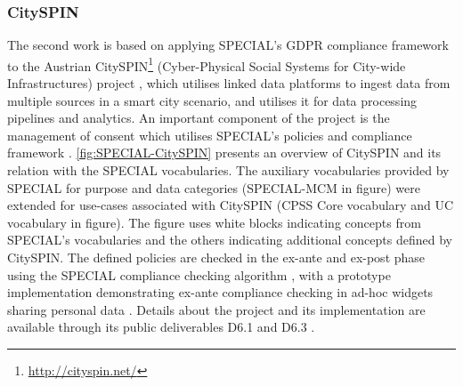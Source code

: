 

\subsubsection{CitySPIN}
The second work is based on applying SPECIAL's GDPR compliance framework to the Austrian CitySPIN\footnote{\url{http://cityspin.net/}} (Cyber-Physical Social Systems for City-wide Infrastructures) project \cite{fernandez_user_2019}, which utilises linked data platforms to ingest data from multiple sources in a smart city scenario, and utilises it for data processing pipelines and analytics. An important component of the project is the management of consent which utilises SPECIAL's policies \cite{bonatti_special_2018-1,bonatti_special_2018-2} and compliance framework \cite{kirrane_scalable_2018}.
\autoref{fig:SPECIAL-CitySPIN} presents an overview of CitySPIN and its relation with the SPECIAL vocabularies. The auxiliary vocabularies provided by SPECIAL for purpose and data categories (SPECIAL-MCM in figure) were extended for use-cases associated with CitySPIN (CPSS Core vocabulary and UC vocabulary in figure).
The figure uses white blocks indicating concepts from SPECIAL's vocabularies and the others indicating additional concepts defined by CitySPIN.
The defined policies are checked in the ex-ante and ex-post phase using the SPECIAL compliance checking algorithm \cite{bonatti_fast_2018,bonatti_richer_2019}, with a prototype implementation demonstrating ex-ante compliance checking in ad-hoc widgets sharing personal data \cite{fernandez_privacy-aware_2019}. Details about the project and its implementation are available through its public deliverables D6.1 \cite{noauthor_d6.1_nodate} and D6.3 \cite{noauthor_d6.3_nodate}.
